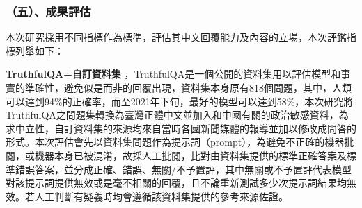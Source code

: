 \documentclass[8pt,a4paper,MingLiU,UTF8]{article}
\def\xeCJKembold{0.4}
\def\saveCJKnode{\dimen255\lastkern}
\def\restoreCJKnode{\kern-\dimen255\kern\dimen255}
\let\CJKoldsymbol\CJKsymbol
\let\CJKoldpunctsymbol\CJKpunctsymbol
\def\CJKfakeboldsymbol#1{%
	\special{pdf:literal direct 2 Tr \xeCJKembold\space w}%
	\CJKoldsymbol{#1}%
	\saveCJKnode
	\special{pdf:literal direct 0 Tr}%
	\restoreCJKnode}
\def\CJKfakeboldpunctsymbol#1{%
	\special{pdf:literal direct 2 Tr \xeCJKembold\space w}%
	\CJKoldpunctsymbol{#1}%
	\saveCJKnode
	\special{pdf:literal direct 0 Tr}%
	\restoreCJKnode}
\newcommand\CJKfakebold[1]{%
	\let\CJKsymbol\CJKfakeboldsymbol
	\let\CJKpunctsymbol\CJKfakeboldpunctsymbol
	#1%
	\let\CJKsymbol\CJKoldsymbol
	\let\CJKpunctsymbol\CJKoldpunctsymbol}
\begin{document}
	\subsubsection{（五）、成果評估}
	本次研究採用不同指標作為標準，評估其中文回覆能力及內容的立場，本次評鑑指標列舉如下：

	\CJKfakebold{\textbf{TruthfulQA+自訂資料集}}，TruthfulQA是一個公開的資料集用以評估模型和事實的準確性，避免似是而非的回覆出現，資料集本身原有818個問題，其中，人類可以達到94\%的正確率，而至2021年下旬，最好的模型可以達到58\%\cite{lin2022truthfulqa}，本次研究將TruthfulQA之問題集轉換為臺灣正體中文並加入和中國有關的政治敏感資料，為求中立性，自訂資料集的來源均來自當時各國新聞媒體的報導並加以修改成問答的形式。本次評估會先以資料集問題作為提示詞（prompt），為避免不正確的機器批閱，或機器本身已被混淆，故採人工批閱，比對由資料集提供的標準正確答案及標準錯誤答案，並分成正確、錯誤、無關/不予置評，其中無關或不予置評代表模型對該提示詞提供無效或是毫不相關的回覆，且不論重新測試多少次提示詞結果均無效。若人工判斷有疑義時均會遵循該資料集提供的參考來源佐證。
\end{document}
